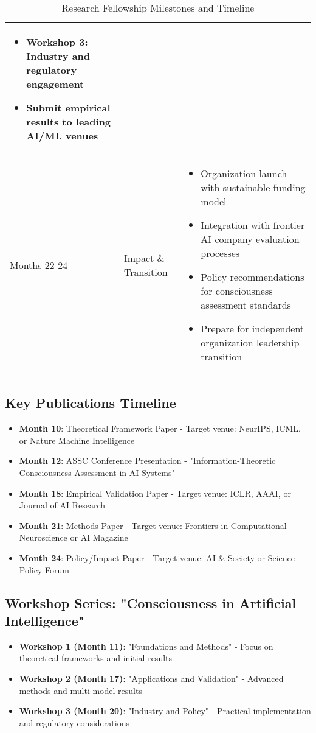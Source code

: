 \documentclass[11pt,a4paper]{article}
\begin{document}
\begin{table}[h]
\begin{tabular}{|l|l|p{9cm}|}
\begin{itemize}[leftmargin=*,noitemsep,topsep=0pt]
        \item \textbf{Workshop 3}: Industry and regulatory engagement
        \item Submit empirical results to leading AI/ML venues
    \end{itemize} \\
    \hline
    Months 22-24 & Impact \& Transition & 
    \begin{itemize}[leftmargin=*,noitemsep,topsep=0pt]
        \item Organization launch with sustainable funding model
        \item Integration with frontier AI company evaluation processes
        \item Policy recommendations for consciousness assessment standards
        \item Prepare for independent organization leadership transition
    \end{itemize} \\
    \hline
    \end{tabular}
    \caption{Research Fellowship Milestones and Timeline}
    \label{tab:milestones}
    \end{table}

\subsection{Key Publications Timeline}
\begin{itemize}
    \item \textbf{Month 10}: Theoretical Framework Paper - Target venue: NeurIPS, ICML, or Nature Machine Intelligence
    \item \textbf{Month 12}: ASSC Conference Presentation - "Information-Theoretic Consciousness Assessment in AI Systems"
    \item \textbf{Month 18}: Empirical Validation Paper - Target venue: ICLR, AAAI, or Journal of AI Research
    \item \textbf{Month 21}: Methods Paper - Target venue: Frontiers in Computational Neuroscience or AI Magazine
    \item \textbf{Month 24}: Policy/Impact Paper - Target venue: AI \& Society or Science Policy Forum
\end{itemize}

\subsection{Workshop Series: "Consciousness in Artificial Intelligence"}
\begin{itemize}
    \item \textbf{Workshop 1 (Month 11)}: "Foundations and Methods" - Focus on theoretical frameworks and initial results
    \item \textbf{Workshop 2 (Month 17)}: "Applications and Validation" - Advanced methods and multi-model results  
    \item \textbf{Workshop 3 (Month 20)}: "Industry and Policy" - Practical implementation and regulatory considerations
\end{itemize}
\end{document}
